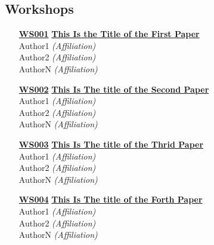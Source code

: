 \subsection{Workshops}
\begin{enumerate}
\item[\href{https://doi.org/10.1145/1122445.1122456}{\textbf{WS001}}]
\href{https://doi.org/10.1145/1122445.1122456}{\textbf{This Is the Title of the First Paper}}\\
Author1 \emph{(Affiliation)}\\
Author2 \emph{(Affiliation)}\\
AuthorN \emph{(Affiliation)}\\

\item[\href{https://doi.org/10.1145/1122445.1122456}{\textbf{WS002}}]
\href{https://doi.org/10.1145/1122445.1122456}{\textbf{This Is The title of the Second Paper}}\\
Author1 \emph{(Affiliation)}\\
Author2 \emph{(Affiliation)}\\
AuthorN \emph{(Affiliation)}\\

\item[\href{https://doi.org/10.1145/1122445.1122456}{\textbf{WS003}}]
\href{https://doi.org/10.1145/1122445.1122456}{\textbf{This Is The title of the Thrid Paper}}\\
Author1 \emph{(Affiliation)}\\
Author2 \emph{(Affiliation)}\\
AuthorN \emph{(Affiliation)}\\

\item[\href{https://doi.org/10.1145/1122445.1122456}{\textbf{WS004}}]
\href{https://doi.org/10.1145/1122445.1122456}{\textbf{This Is The title of the Forth Paper}}\\
Author1 \emph{(Affiliation)}\\
Author2 \emph{(Affiliation)}\\
AuthorN \emph{(Affiliation)}\\
\end{enumerate}